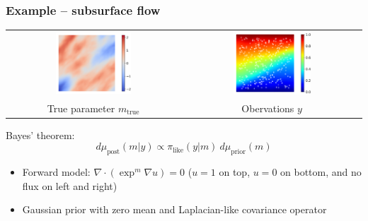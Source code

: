 \documentclass{beamer}
\begin{document}
\begin{frame}[c]
  \frametitle{Example -- subsurface flow}

  \begin{tabular}{cc}
    \includegraphics[width=0.45\textwidth]{./figures/ex1_true_parameter.png}
    &
    \includegraphics[width=0.45\textwidth]{./figures/ex1_true_state_observation.png}
    \\
    True parameter $m_{\text{true}}$
    &
    Obervations $y$
  \end{tabular}

  \vspace{0.3cm}

  Bayes' theorem:
  \[
    d \mu_{\text{post}} (m|y) \propto \pi_{\text{like}} (y|m) \ d
    \mu_{\text{prior}} (m)
  \]

  \begin{itemize}
    \item Forward model: $\nabla \cdot (\exp^m \nabla u) = 0$ ($u=1$ on top,
      $u=0$ on bottom, and no flux on left and right)
    \item Gaussian prior with zero mean and Laplacian-like covariance operator
  \end{itemize}
\end{frame}
\end{document}
